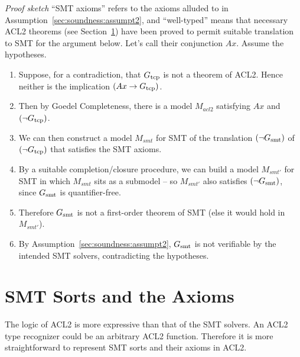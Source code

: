 \emph{Proof sketch} ``SMT axioms'' refers to the axioms alluded to
in Assumption~\ref{sec:soundness:assumpt2}, and ``well-typed'' means that
necessary ACL2 theorems (see Section~\ref{sec:soundness:sorts}) have
   been proved to permit suitable translation to SMT for the argument below.
   Let's call their conjunction $Ax$.
   Assume the hypotheses.
   \\
   \begin{enumerate}
   \item Suppose, for a contradiction, that $G_{\mathrm{tcp}}$ is not a theorem of ACL2.
      Hence neither is the implication $(Ax \rightarrow G_{\mathrm{tcp}})$.
   \item Then by Goedel Completeness, there is a model $M_{acl2}$ satisfying
      $Ax$ and $(\neg G_{\mathrm{tcp}})$.
   \item We can then construct a model $M_{smt}$ for SMT of the translation
      $(\neg G_{\mathrm{smt}})$ of $(\neg G_{\mathrm{tcp}})$ that satisfies the SMT axioms. 
   \item By a suitable completion/closure procedure, we can build a model
      $M_{smt'}$ for SMT in which $M_{smt}$ sits as a submodel -- so $M_{smt'}$
      also satisfies $(\neg G_{\mathrm{smt}})$, since $G_{\mathrm{smt}}$ is quantifier-free. 
   \item Therefore $G_{\mathrm{smt}}$ is not a first-order theorem of SMT (else it would
      hold in $M_{smt'}$).
   \item By Assumption~\ref{sec:soundness:assumpt2}, $G_{\mathrm{smt}}$ is not verifiable
     by the intended SMT solvers, contradicting the hypotheses.
   \end{enumerate}

\section{SMT Sorts and the Axioms}\label{sec:soundness:sorts}
The logic of ACL2 is more expressive than that of the SMT solvers. An ACL2 type
recognizer could be an arbitrary ACL2 function. Therefore it
is more straightforward to represent SMT sorts and their axioms in ACL2.

